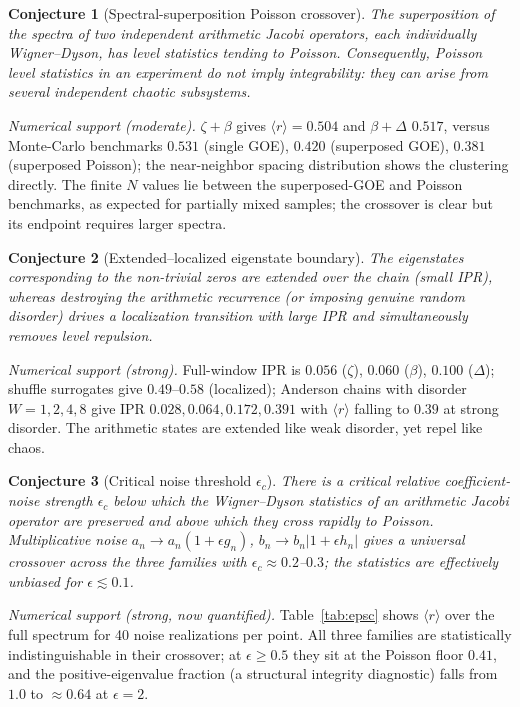 \documentclass[aps,prx,reprint,floatfix]{revtex4-2}
\newtheorem{conjecture}{Conjecture}
\begin{document}
\begin{conjecture}[Spectral-superposition Poisson crossover]
\label{conj:sup}
The superposition of the spectra of two independent arithmetic Jacobi
operators, each individually Wigner--Dyson, has level statistics tending to
Poisson. Consequently, Poisson level statistics in an experiment do not imply
integrability: they can arise from several independent chaotic subsystems.
\end{conjecture}
\noindent\emph{Numerical support (moderate).} $\zeta+\beta$ gives
$\langle r\rangle=0.504$ and $\beta+\Delta$ $0.517$, versus Monte-Carlo
benchmarks $0.531$ (single GOE), $0.420$ (superposed GOE), $0.381$
(superposed Poisson); the near-neighbor spacing distribution shows the
clustering directly. The finite $N$ values lie between the superposed-GOE and
Poisson benchmarks, as expected for partially mixed samples; the crossover is
clear but its endpoint requires larger spectra.

\begin{conjecture}[Extended--localized eigenstate boundary]
\label{conj:ipr}
The eigenstates corresponding to the non-trivial zeros are extended over the
chain (small IPR), whereas destroying the arithmetic recurrence (or imposing
genuine random disorder) drives a localization transition with large IPR and
simultaneously removes level repulsion.
\end{conjecture}
\noindent\emph{Numerical support (strong).} Full-window IPR is
$0.056$ ($\zeta$), $0.060$ ($\beta$), $0.100$ ($\Delta$); shuffle surrogates
give $0.49$--$0.58$ (localized); Anderson chains with disorder $W=1,2,4,8$
give IPR $0.028,0.064,0.172,0.391$ with $\langle r\rangle$ falling to
$0.39$ at strong disorder. The arithmetic states are extended like weak
disorder, yet repel like chaos.

\begin{conjecture}[Critical noise threshold $\epsilon_c$]
\label{conj:noise}
There is a critical relative coefficient-noise strength $\epsilon_c$ below
which the Wigner--Dyson statistics of an arithmetic Jacobi operator are
preserved and above which they cross rapidly to Poisson. Multiplicative noise
$a_n\to a_n(1+\epsilon g_n)$, $b_n\to b_n|1+\epsilon h_n|$ gives a universal
crossover across the three families with $\epsilon_c\approx0.2$--$0.3$; the
statistics are effectively unbiased for $\epsilon\lesssim0.1$.
\end{conjecture}
\noindent\emph{Numerical support (strong, now quantified).}
Table~\ref{tab:epsc} shows $\langle r\rangle$ over the full spectrum for
40 noise realizations per point. All three families are statistically
indistinguishable in their crossover; at $\epsilon\ge0.5$ they sit at the
Poisson floor $0.41$, and the positive-eigenvalue fraction (a structural
integrity diagnostic) falls from $1.0$ to $\approx0.64$ at $\epsilon=2$.
\end{document}
